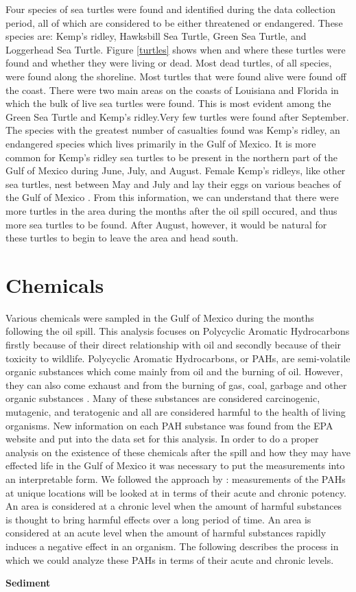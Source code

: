 \documentclass[authoryear,12pt]{elsarticle}
\begin{document}
Four species of sea turtles were found and identified during the data collection period, all of which are considered to be either threatened or endangered. These species are: Kemp's ridley, Hawksbill Sea Turtle, Green Sea Turtle, and Loggerhead Sea Turtle. Figure \ref{turtles} shows when and where these turtles were found and whether they were living or dead. Most dead turtles, of all species, were found along the shoreline. Most turtles that were found alive were found off the coast. There were two main areas on the coasts of Louisiana and Florida in which the bulk of live sea turtles were found.  This is most evident among the Green Sea Turtle and Kemp's ridley.Very few turtles were found after September. The species with the greatest number of casualties found was Kemp's ridley, an endangered species which lives primarily in the Gulf of Mexico.  It is more common for Kemp's ridley sea turtles to be present in the northern part of the Gulf of Mexico during June, July, and August. Female Kemp's ridleys, like other sea turtles, nest between May and July and lay their eggs on various beaches of the Gulf of Mexico  \citet{turtles}. From this information, we can understand that there were more turtles in the area during the months after the oil spill occured, and thus more sea turtles to be found.  After August, however, it would be natural for these turtles to begin to leave the area and head south.

\section{Chemicals}


Various chemicals were sampled in the Gulf of Mexico during the months following the oil spill. This analysis focuses on Polycyclic Aromatic Hydrocarbons firstly because of their direct relationship with oil and secondly because of their toxicity to wildlife. Polycyclic Aromatic Hydrocarbons, or PAHs, are semi-volatile organic substances which come mainly from oil and the burning of oil. However, they can also come exhaust and from the burning of gas, coal, garbage and other organic substances \citep{pah}.   Many of these substances are considered carcinogenic, mutagenic, and teratogenic and all are considered harmful to the health of living organisms. New information on each PAH substance was found from the EPA website  \citep{pah} and put into the data set for this analysis. In order to do a proper analysis on the existence of these chemicals after the spill and how they may have effected life in the Gulf of Mexico it was necessary to put the measurements into an interpretable form. We followed the approach by \citet{pah-benchmark}: measurements of the PAHs at unique locations will be looked at in terms of their acute and chronic potency. An area is considered at a chronic level when the amount of harmful substances is thought to bring harmful effects over a long period of time. An area is considered at an acute level when the amount of harmful substances rapidly induces a negative effect in an organism. The following describes the process in which we could analyze these PAHs in terms of their acute and chronic levels. 
\begin{center} \textbf{Sediment} \end{center}
\end{document}
